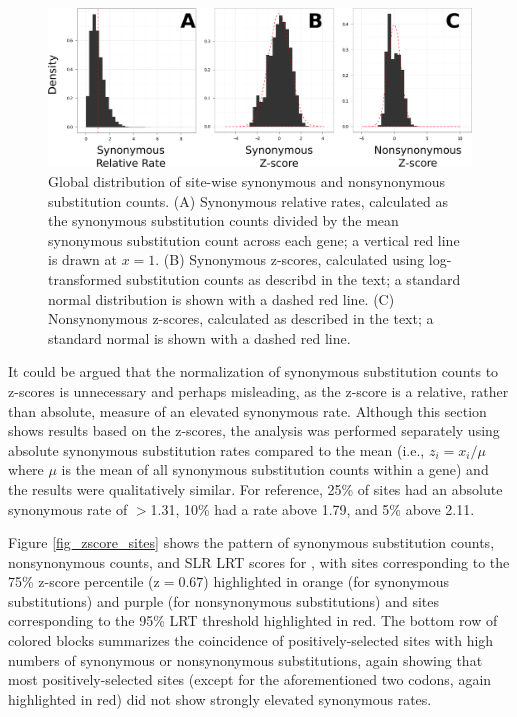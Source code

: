 \begin{figure}
\centering
\includegraphics[scale=0.4]{Figs/zscore_histograms.pdf}
\caption{Global distribution of site-wise synonymous and nonsynonymous
  substitution counts. (A) Synonymous relative rates, calculated as
  the synonymous substitution counts divided by the mean synonymous
  substitution count across each gene; a vertical red line is drawn at
  $x=1$. (B) Synonymous z-scores, calculated using log-transformed
  substitution counts as describd in the text; a standard normal
  distribution is shown with a dashed red line. (C) Nonsynonymous
  z-scores, calculated as described in the text; a standard normal is
  shown with a dashed red line.}
\label{fig_zscore_histogram}
\end{figure}


It could be argued that the normalization of synonymous substitution
counts to z-scores is unnecessary and perhaps misleading, as the
z-score is a relative, rather than absolute, measure of an elevated
synonymous rate. Although this section shows results based on the
z-scores, the analysis was performed separately using absolute
synonymous substitution rates compared to the mean (i.e., $z_{i} =
x_{i} / \mu$ where $\mu$ is the mean of all synonymous substitution
counts within a gene) and the results were qualitatively similar. For
reference, 25\% of sites had an absolute synonymous rate of $>$1.31,
10\% had a rate above 1.79, and 5\% above 2.11.

Figure \ref{fig_zscore_sites} shows the pattern of synonymous
substitution counts, nonsynonymous counts, and SLR LRT scores for
, with sites corresponding to the 75\% z-score percentile
(z$=0.67$) highlighted in orange (for synonymous substitutions) and
purple (for nonsynonymous substitutions) and sites corresponding to
the 95\% LRT threshold highlighted in red. The bottom row of colored
blocks summarizes the coincidence of positively-selected sites with
high numbers of synonymous or nonsynonymous substitutions, again
showing that most positively-selected sites (except for the
aforementioned two codons, again highlighted in red) did not show
strongly elevated synonymous rates.

